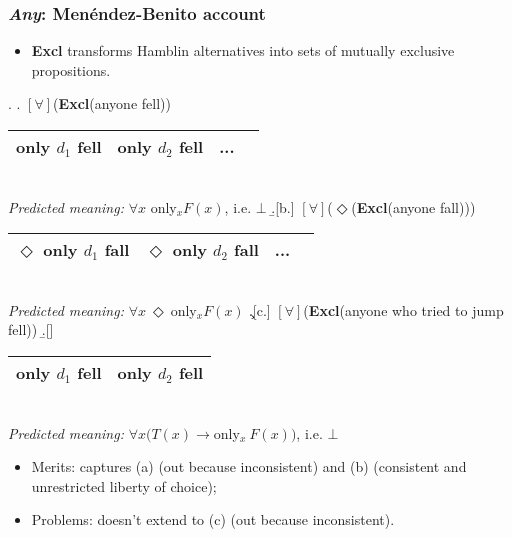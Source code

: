 \documentclass{beamer}
\newcommand{\bit}{\begin{itemize}}
\newcommand{\eit}{\end{itemize}}
\newcommand{\btar}{\begin{tabular}}
\newcommand{\etar}{\end{tabular}}
\begin{document}
\frame
{\frametitle{{\it Any}: Men\'endez-Benito account}
\bit
 \item {\small {\bf Excl} transforms Hamblin alternatives into    sets of mutually exclusive propositions.}
 \eit

\ex. \label{mb}
\a. $[\forall]$({\bf Excl}(anyone fell)) 
\  \hfill
 {\scriptsize \btar{|c|c|c|c|}  \hline    only $d_1$ fell  &  only  $d_2$ fell    & ...
 \\
  \hline
\etar
  }
  \\ \vspace{0,2cm}  {\it Predicted meaning:} $\forall x$ {\sc only}$_x F(x)$, i.e. $\bot$  
   \vspace{0,3cm}
 \b.[b.]
$[\forall]$($\Diamond$({\bf Excl}(anyone   fall))) 
  \hfill
  {\scriptsize \btar{|c|c|c|c|}  \hline $\Diamond $ only $d_1$ fall  &  $\Diamond $ only $d_2$ fall   & ...
 \\
  \hline
\etar
  }  \\ \vspace{0,2cm}  {\it Predicted meaning:} $\forall x \: \Diamond \:${\sc only}$_x  F(x)$
  \vspace{0,3cm}
  \c.[c.]
$[\forall]$({\bf Excl}(anyone who tried to jump fell))  
\vspace{0,1cm}
\b.[] \ \hfill
 {\scriptsize \btar{|c|c|}  \hline only $d_1$ fell  &    only $d_2$ fell     \\
 \hline
\etar
  }  
  \\ \vspace{0,2cm}  {\it Predicted meaning:} $\forall x(T(x) \to${\sc only}$_x \: F(x))$, i.e. $\bot$  

  
  
\bit

\item {\sc Merits}: captures (a) (out because inconsistent) and (b) (consistent and unrestricted liberty of choice);
\item {\sc Problems}: doesn't extend to (c) (out because inconsistent).
\eit}
\end{document}
